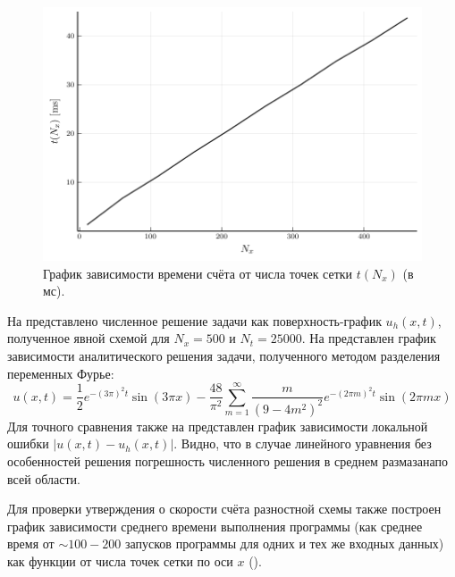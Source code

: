 \begin{figure}
    \centering
    \includegraphics{Разностные_схемы_на_статических_сетках/Программный_код_примеры_расчётов/explicit_scheme/problem_1_explicit_time.pdf}
    \caption{График зависимости времени счёта от числа точек сетки $t(N_x)$ (в мс).}
    \label{fig:problem_1_explicit_time}
\end{figure}
На  представлено численное решение задачи как поверхность-график $u_h(x, t)$, полученное явной схемой для $N_x = 500$ и $N_t = 25000$.
На  представлен график зависимости аналитического решения задачи, полученного методом разделения переменных Фурье:
\begin{equation*}
    u(x, t) = \frac{1}{2}e^{-(3\pi)^2 t}\sin (3\pi x) - \frac{48}{\pi^2}\sum\limits_{m=1}^{\infty} \frac{m}{(9 - 4m^2)^2}e^{-(2\pi m)^2 t}\sin (2\pi m x)
\end{equation*}
Для точного сравнения также на  представлен график зависимости локальной ошибки $|u(x, t) - u_h(x, t)|$.
Видно, что в случае линейного уравнения без особенностей решения погрешность численного решения в среднем \glqq размазана\grqq по всей области.

Для проверки утверждения о скорости счёта разностной схемы также построен график зависимости среднего времени выполнения программы (как среднее время от $\sim 100-200$ запусков программы для одних и тех же входных данных) как функции от числа точек сетки по оси $x$ ().





